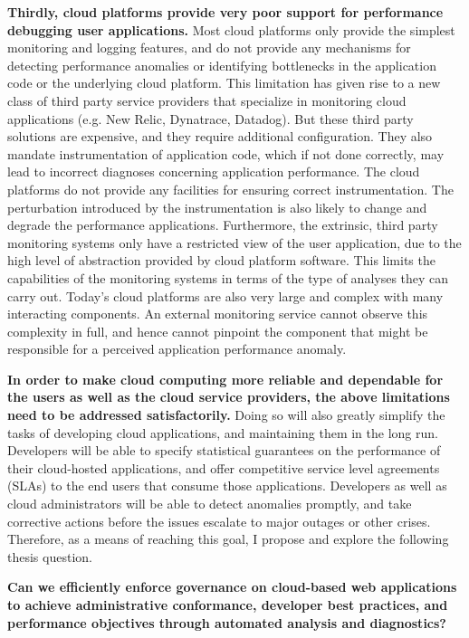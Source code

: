 \textbf{Thirdly, cloud platforms provide very poor support for performance debugging
user applications.} Most cloud platforms only provide the simplest monitoring and logging features,
and do not provide any mechanisms for detecting performance anomalies or identifying
bottlenecks in the application code or the underlying cloud platform. This limitation has given rise
to a new class of third party service providers that specialize in monitoring cloud applications
(e.g. New Relic, Dynatrace, Datadog). But these third party solutions are expensive, and they 
require additional configuration. 
They also mandate instrumentation of application code, which if not done
correctly, may lead to incorrect diagnoses concerning application performance. The cloud
platforms do not provide any facilities for ensuring correct instrumentation. The perturbation
introduced by the instrumentation is also likely to change and degrade the performance
applications.
Furthermore, the extrinsic, third party monitoring systems only have a restricted view 
of the user application, due to the high level of abstraction provided by cloud platform software.
This limits the capabilities of the monitoring systems in terms of the type of analyses they can carry out.
Today's cloud platforms are also very large and complex with many interacting components.
An external monitoring service cannot observe this complexity in full, and hence cannot pinpoint
the component that might be responsible for a perceived application performance anomaly.

\textbf{In order to make cloud computing more reliable and dependable for the users as well
as the cloud service providers, the above limitations need to be addressed satisfactorily.}
Doing so will also greatly simplify the tasks of developing cloud applications, and maintaining 
them in the long run. Developers will be able to specify statistical guarantees on the performance of
their cloud-hosted applications, and offer competitive service level agreements (SLAs) to the end users that consume those
applications. Developers as well as cloud administrators will be able to detect anomalies
promptly, and take corrective actions before the issues escalate to major
outages or other crises. Therefore, as a means of reaching this goal, I propose and explore the
following thesis question.

{\bf Can we efficiently enforce governance on cloud-based web applications to achieve 
administrative conformance, developer best practices, and performance objectives through 
automated analysis and diagnostics?} 

